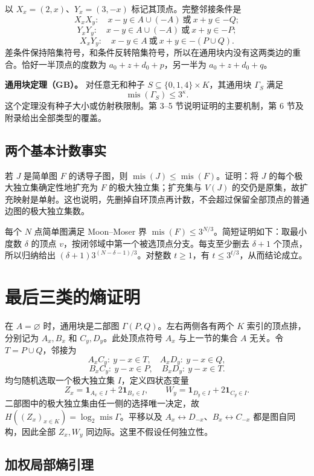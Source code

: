 \documentclass[11pt]{ctexart}
\begin{document}
以 \(X_x=(2,x)\)、\(Y_x=(3,-x)\) 标记其顶点。完整邻接条件是
\[
 X_xX_y:\quad x-y\in A\cup(-A)\ \text{或}\ x+y\in-Q;
\]
\[
 Y_xY_y:\quad x-y\in A\cup(-A)\ \text{或}\ x+y\in-P;
\]
\[
 X_xY_y:\quad x-y\in A\ \text{或}\ x+y\in-(P\cup Q).
\]
差条件保持陪集符号，和条件反转陪集符号，所以在通用块内没有这两类边的重合。恰好一半顶点的度数为 \(a_0+z+d_0+p\)，另一半为 \(a_0+z+d_0+q\)。

\textbf{通用块定理（GB）。} 对任意无和种子 \(S\subseteq\{0,1,4\}\times K\)，其通用块 \(\Gamma_S\) 满足
\[
 \operatorname{mis}(\Gamma_S)\le 3^\kappa.
\]
这个定理没有种子大小或仿射秩限制。第 3--5 节说明证明的主要机制，第 6 节及附录给出全部类型的覆盖。

\subsection{两个基本计数事实}

若 \(J\) 是简单图 \(F\) 的诱导子图，则 \(\operatorname{mis}(J)\le\operatorname{mis}(F)\)。证明：将 \(J\) 的每个极大独立集确定性地扩充为 \(F\) 的极大独立集；扩充集与 \(V(J)\) 的交仍是原集，故扩充映射是单射。这也说明，先删掉自环顶点再计数，不会超过保留全部顶点的普通边图的极大独立集数。

每个 \(N\) 点简单图满足 Moon--Moser 界 \(\operatorname{mis}(F)\le3^{N/3}\)。简短证明如下：取最小度数 \(\delta\) 的顶点 \(v\)，按闭邻域中第一个被选顶点分支。每支至少删去 \(\delta+1\) 个顶点，所以归纳给出 \((\delta+1)3^{(N-\delta-1)/3}\)。对整数 \(t\ge1\)，有 \(t\le3^{t/3}\)，从而结论成立。

\section{最后三类的熵证明}

在 \(A=\varnothing\) 时，通用块是二部图 \(\Gamma(P,Q)\)。左右两侧各有两个 \(K\) 索引的顶点排，分别记为 \(A_x,B_x\) 和 \(C_y,D_y\)。此处顶点符号 \(A_x\) 与上一节的集合 \(A\) 无关。令 \(T=P\cup Q\)，邻接为
\[
 A_xC_y:\ y-x\in T,\quad A_xD_y:\ y-x\in Q,
\]
\[
 B_xC_y:\ y-x\in P,\quad B_xD_y:\ y-x\in T.
\]
均匀随机选取一个极大独立集 \(I\)，定义四状态变量
\[
 Z_x=\mathbf{1}_{A_x\in I}+2\mathbf{1}_{B_x\in I},\qquad
 W_y=\mathbf{1}_{D_y\in I}+2\mathbf{1}_{C_y\in I}.
\]
二部图中的极大独立集由任一侧的选择唯一决定，故 \(H((Z_x)_{x\in K})=\log_2\operatorname{mis}\Gamma\)。平移以及 \(A_x\leftrightarrow D_{-x}\)、\(B_x\leftrightarrow C_{-x}\) 都是图自同构，因此全部 \(Z_x,W_y\) 同边际。这里不假设任何独立性。

\subsection{加权局部熵引理}
\end{document}
